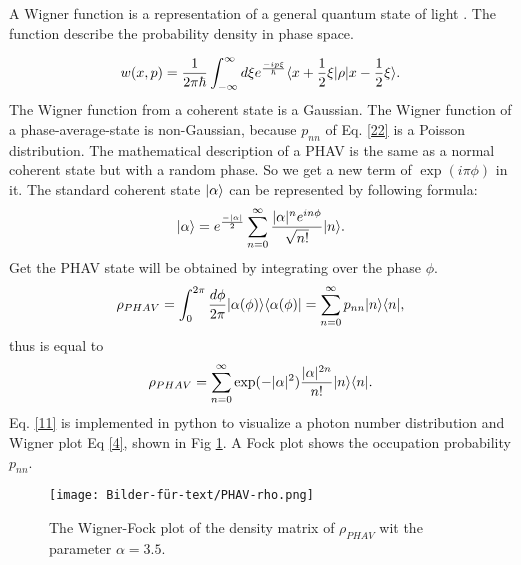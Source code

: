 \documentclass[12pt,a4paper]{article}
\DeclarePairedDelimiter\bra{\langle}{\rvert}
\DeclarePairedDelimiter\ket{\lvert}{\rangle}
\begin{document}
A Wigner function is a representation of a general quantum state of light \cite{Allevi2013}.
The function describe the probability density in phase space.

\begin{equation}
w(x,p)=\frac{1}{2\pi \hbar}\int_{- \infty}^{\infty} d\xi e^{\frac{-i p \xi}{\hbar}}\bra{x+\frac{1}{2}\xi}\rho\ket{x-\frac{1}{2}\xi}.\label{4}
\end{equation}
The Wigner function from a coherent state is a Gaussian. The Wigner function of a phase-average-state is non-Gaussian, because $p_{nn} $ of Eq. \eqref{22}  is a  Poisson distribution. 
The mathematical description of a  PHAV is the same as a normal coherent state but with a random phase. So we get a new term of $\exp(i\pi\phi)$ in it. 
The standard coherent state $\ket{\alpha}$ can be represented by following formula: 
\begin{equation}
\ket{\alpha}=e^{\frac{-|\alpha|}{2}}\sum_{n=0}^{\infty}\frac{|\alpha|^n e^{in\phi}}{\sqrt{n!}} \ket{n}.
\end{equation}
Get the PHAV state will be obtained by integrating over the phase $\phi$.
\begin{equation}
\rho_{PHAV}=\int_0 ^{2\pi}\frac{d\phi}{2\pi}\ket{\alpha(\phi)}\bra{\alpha(\phi)}=\sum_{n=0}^{\infty}p_{nn}\ket{n}\bra{n},\label{22}
\end{equation}
thus is equal to
\begin{equation}
\rho_{PHAV}= \sum_{n=0}^{\infty}\exp(-|\alpha|^2)\frac{|\alpha|^{2n}}{n!} \ket{n}\bra{n}.\label{11}
\end{equation}
Eq. \eqref{11} is implemented in python to visualize a photon number distribution and Wigner plot  Eq \eqref{4}, shown in Fig \ref{21}.
A Fock plot shows the occupation probability $p_{nn}$.


\begin{figure}[hbtp]
\hspace{-1.4cm}
\texttt{[image: Bilder-für-text/PHAV-rho.png]}\label{21}
\caption{The Wigner-Fock plot of the density matrix of $\rho_{PHAV}$ wit the parameter $\alpha=3.5$.}
\end{figure}
\end{document}
